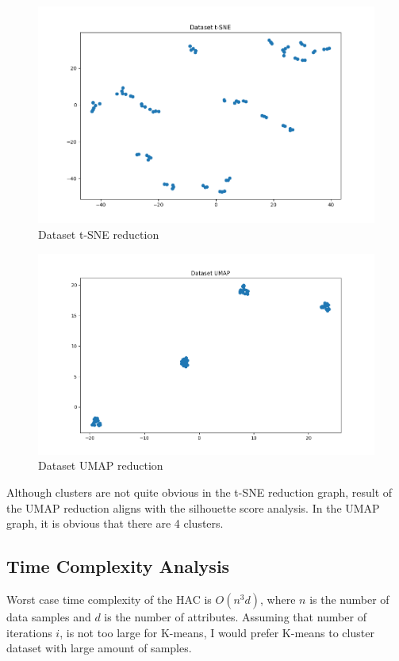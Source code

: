 \documentclass[12pt,a4paper, margin=1in]{article}
\begin{document}
\begin{figure}[H]
    \centering
    \includegraphics[scale=0.75]{hac_dataset_tsne.png}
    \caption{Dataset t-SNE reduction}
\end{figure}

\begin{figure}[H]
    \centering
    \includegraphics[scale=0.65]{hac_dataset_umap.png}
    \caption{Dataset UMAP reduction}
\end{figure}

Although clusters are not quite obvious in the t-SNE reduction graph, result of the UMAP reduction aligns with the silhouette score analysis. 
In the UMAP graph, it is obvious that there are 4 clusters.

\subsection{Time Complexity Analysis}

Worst case time complexity of the HAC is $O(n^3d)$, where $n$ is the number of data samples and $d$ is the number of attributes. Assuming that number of iterations $i$,
is not too large for K-means, I would prefer K-means to cluster dataset with large amount of samples.
\end{document}
